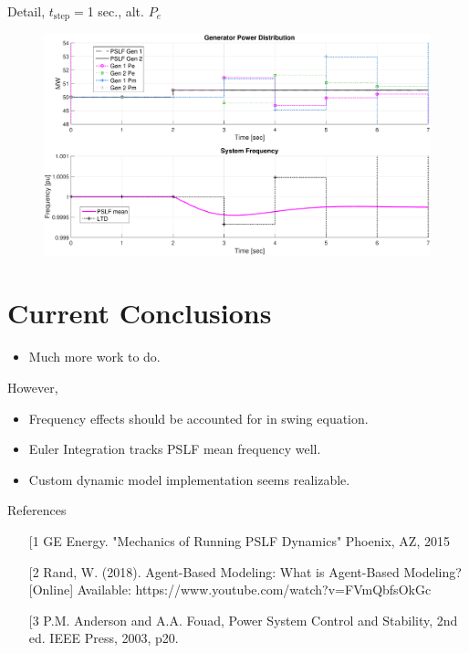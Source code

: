 \documentclass[14pt, unknownkeysallowed]{beamer}
\begin{document}
\begin{frame}
Detail, $t_\text{step}=$1 sec., alt. $P_e$
\begin{figure}
	\includegraphics[width=\linewidth]{pgov1B1detail}
\end{figure}
\end{frame}

\section{Current Conclusions}
\begin{frame}
\begin{itemize}
	\item Much more work to do.
\end{itemize}
However,
\begin{itemize}
	\item Frequency effects should be accounted for in swing equation.
	\item Euler Integration tracks PSLF mean frequency well.
	\item Custom dynamic model implementation seems realizable. 
\end{itemize}
\end{frame}

\begin{frame}
References\vspace{1em}\\
\begin{minipage}{\textwidth}
	\footnotesize
	\begin{itemize}
	\item[[1] GE Energy. "Mechanics of Running PSLF Dynamics" Phoenix, AZ, 2015
	\item[[2] Rand, W. (2018). Agent-Based Modeling: What is Agent-Based Modeling? [Online] Available: https://www.youtube.com/watch?v=FVmQbfsOkGc
	\item[[3] P.M. Anderson and A.A. Fouad, Power System Control and Stability, 2nd ed. IEEE Press, 2003, p20.
\end{itemize}
\end{minipage}
\end{frame}
\end{document}
